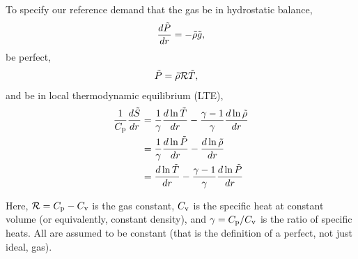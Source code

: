\documentclass[12pt]{article}
\numberwithin{equation}{section}
\begin{document}
	To specify our reference demand that the gas be in hydrostatic balance,
	\begin{align}\label{eq:dimhydro}
	\frac{d\tilde{P}}{dr}= -\tilde{\rho} \tilde{g},
	\end{align}
	be perfect,
	\begin{align}
	\tilde{P} &= \tilde{\rho}\mathcal{R} \tilde{T},\label{eq:dimidgas}
	\end{align}
	and be in local thermodynamic equilibrium (LTE), 
	\begin{subequations}\label{eq:dimfirstlaw}
	\begin{align}
		\frac{1}{C_{\rm{p}}}\frac{d\tilde{S}}{dr}&=\frac{1}{\gamma}\frac{d\ln\tilde{T}}{dr} - \frac{\gamma - 1}{\gamma}\frac{d\ln\tilde{\rho}}{dr}\label{eq:dimfirstlawtmprho}\\
		&=\frac{1}{\gamma}\frac{d\ln\tilde{P}}{dr} - \frac{d\ln\tilde{\rho}}{dr}\label{eq:dimfirstlawprsrho}\\
		&= \frac{d\ln\tilde{T}}{dr} - \frac{\gamma - 1}{\gamma}\frac{d\ln\tilde{P}}{dr}\label{eq:dimfirstlawtmpprs}
	\end{align}
	\label{eq:firstlaw3}
\end{subequations}

Here, $\mathcal{R}=C_{\rm{p}}-C_{\rm{v}}$ is the gas constant, $C_{\rm{v}}$ is the specific heat at constant volume (or equivalently, constant density), and $\gamma=C_{\rm{p}}/C_{\rm{v}}$ is the ratio of specific heats. All are assumed to be constant (that is the definition of a perfect, not just ideal, gas). 
\end{document}
